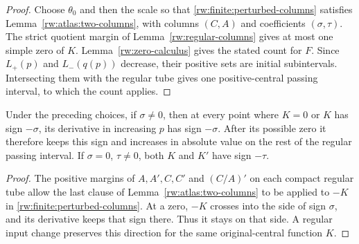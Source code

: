 \begin{proof}
Choose $\theta_0$ and then the scale so that
\eqref{rw:finite:perturbed-columns} satisfies
Lemma~\ref{rw:atlas:two-columns}, with columns $(C,A)$ and
coefficients $(\sigma,\tau)$. The strict quotient margin of
Lemma~\ref{rw:regular-columns} gives at most one simple zero of $K$.
Lemma~\ref{rw:zero-calculus} gives the stated count for $F$.
Since $L_+(p)$ and $L_-(q(p))$ decrease, their positive sets are
initial subintervals. Intersecting them with the regular tube gives
one positive-central passing interval, to which the count applies.
\end{proof}

\begin{lemma}
\label{rw:finite:regular-direction}
Under the preceding choices, if $\sigma\ne0$, then at every point
where $K=0$ or $K$ has sign $-\sigma$, its derivative in increasing
$p$ has sign $-\sigma$. After its possible zero it therefore keeps
this sign and increases in absolute value on the rest of the regular
passing interval. If $\sigma=0$, $\tau\ne0$, both $K$ and $K'$
have sign $-\tau$.
\end{lemma}
\begin{proof}
The positive margins of $A,A',C,C'$ and $(C/A)'$ on each compact
regular tube allow the last clause of Lemma~\ref{rw:atlas:two-columns}
to be applied to $-K$ in \eqref{rw:finite:perturbed-columns}.
At a zero, $-K$ crosses into the side of sign $\sigma$, and its
derivative keeps that sign there. Thus it stays on that side. A regular
input change preserves this direction for the same original-central
function $K$.
\end{proof}

